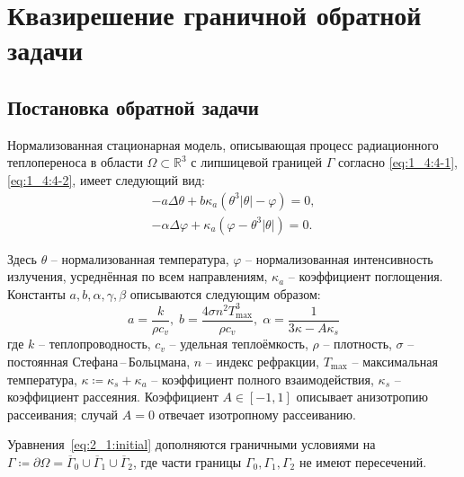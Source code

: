 \section{Квазирешение граничной обратной задачи}\label{sec:ch2/sec1}

\subsection{Постановка обратной задачи}\label{subsec:ch2/sec1/subsec1}

Нормализованная стационарная модель, описывающая процесс радиационного теплопереноса в
области $\Omega \subset \mathbb{R}^3$ с липшицевой границей $\Gamma$ согласно
\eqref{eq:1_4:4-1},\eqref{eq:1_4:4-2}, имеет следующий вид:
\begin{equation}
    \label{eq:2_1:initial}
    \begin{aligned}
        - a \Delta \theta + b \kappa_a(\theta ^ 3 | \theta | - \varphi) = 0,  \\
        - \alpha \Delta \varphi + \kappa_a (\varphi - \theta ^3 | \theta |) = 0.
    \end{aligned}
\end{equation}

Здесь $\theta$ -- нормализованная температура, $\varphi$ -- нормализованная интенсивность излучения,
усреднённая по всем направлениям, $\kappa_a$ -- коэффициент поглощения.
Константы $a, b, \alpha, \gamma, \beta$ описываются следующим образом:
\[
    a = \frac{k}{\rho c_v}, \; b = \frac{4 \sigma n^2 T^3_{\max}}{\rho c_v}, \;
    \alpha = \frac{1}{3\kappa -A \kappa_s}
\]
где $k$ -- теплопроводность, $c_v$ -- удельная теплоёмкость, $\rho$ -- плотность,
$\sigma$ -- постоянная Стефана\,--\,Больцмана, $n$ -- индекс рефракции,
$T_{\max}$ -- максимальная температура,
$\kappa \coloneqq \kappa_s + \kappa_a$ -- коэффициент полного взаимодействия,
$\kappa_s$ -- коэффициент рассеяния.
Коэффициент $A \in [-1,1]$ описывает анизотропию рассеивания;
случай $A=0$ отвечает изотропному рассеиванию.

Уравнения~\eqref{eq:2_1:initial} дополняются граничными условиями на
$\Gamma \coloneqq \partial \Omega =\overline{\Gamma}_0 \cup \overline{\Gamma}_1 \cup \overline{\Gamma}_2$,
где части границы $\Gamma_0, \Gamma_1, \Gamma_2$ не имеют пересечений.

